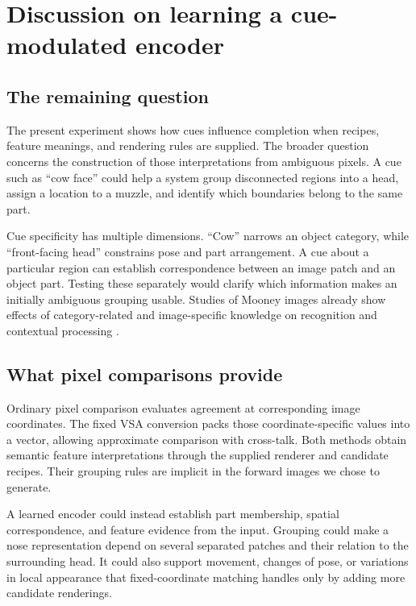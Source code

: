 \documentclass[11pt,letterpaper]{article}
\begin{document}
\section{Discussion on learning a cue-modulated encoder}
\subsection{The remaining question}
The present experiment shows how cues influence completion when recipes, feature meanings, and rendering rules are supplied. The broader question concerns the construction of those interpretations from ambiguous pixels. A cue such as ``cow face'' could help a system group disconnected regions into a head, assign a location to a muzzle, and identify which boundaries belong to the same part.

Cue specificity has multiple dimensions. ``Cow'' narrows an object category, while ``front-facing head'' constrains pose and part arrangement. A cue about a particular region can establish correspondence between an image patch and an object part. Testing these separately would clarify which information makes an initially ambiguous grouping usable. Studies of Mooney images already show effects of category-related and image-specific knowledge on recognition and contextual processing \cite{lazarova2025}.

\subsection{What pixel comparisons provide}
Ordinary pixel comparison evaluates agreement at corresponding image coordinates. The fixed VSA conversion packs those coordinate-specific values into a vector, allowing approximate comparison with cross-talk. Both methods obtain semantic feature interpretations through the supplied renderer and candidate recipes. Their grouping rules are implicit in the forward images we chose to generate.

A learned encoder could instead establish part membership, spatial correspondence, and feature evidence from the input. Grouping could make a nose representation depend on several separated patches and their relation to the surrounding head. It could also support movement, changes of pose, or variations in local appearance that fixed-coordinate matching handles only by adding more candidate renderings.
\end{document}
